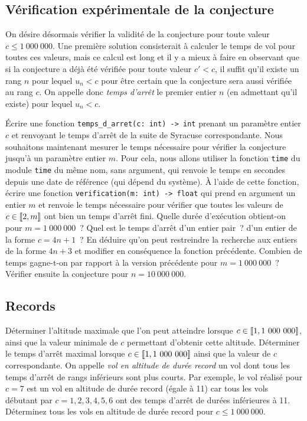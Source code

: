 \documentclass{magnolia}
\begin{document}
\subsection{Vérification expérimentale de la conjecture}

On désire désormais vérifier la validité de la conjecture pour toute valeur $c\leq 1\ 000\ 000$. Une première solution
consisterait à calculer le temps de vol pour toutes ces valeurs, mais ce calcul est long et il y a mieux à faire en
observant que si la conjecture a déjà été vérifiée pour toute valeur $c'<c$, il suffit qu'il existe un rang $n$ pour
lequel $u_n<c$ pour être certain que la conjecture sera aussi vérifiée au rang $c$. On appelle donc
\emph{temps d'arrêt} le premier entier $n$ (en admettant qu'il existe) pour lequel $u_n<c$.

\begin{questions}
\question Écrire une fonction \verb!temps_d_arret(c: int) -> int! prenant un paramètre entier $c$ et renvoyant le temps
  d'arrêt de la suite de Syracuse correspondante.
\enonce Nous souhaitons maintenant mesurer le temps nécessaire pour vérifier la conjecture jusqu'à un paramètre entier
  $m$. Pour cela, nous allons utiliser la fonction \verb!time! du module \verb!time! du même nom, sans argument, qui
  renvoie le temps en secondes depuis une date de référence (qui dépend du système).
\question À l'aide de cette fonction, écrire une fonction \verb!verification(m: int) -> float! qui prend en argument
  un entier $m$ et renvoie le temps nécessaire pour vérifier que toutes les valeurs de $c\in\left\llbracket 2,m\right\rrbracket$ ont bien
  un temps d'arrêt fini. Quelle durée d'exécution obtient-on pour $m=1\ 000\ 000$~?
\question Quel est le temps d'arrêt d'un entier pair~? d'un entier de la forme $c=4n+1$~? En déduire qu'on peut restreindre
  la recherche aux entiers de la forme $4n+3$ et modifier en conséquence la fonction précédente. Combien de temps
  gagne-t-on par rapport à la version précédente pour $m=1\ 000\ 000$~? Vérifier ensuite la conjecture pour
  $n=10\ 000\ 000$.
\end{questions}

\subsection{Records}

\begin{questions}
\question Déterminer l'altitude maximale que l'on peut atteindre lorsque $c\in\left\llbracket 1,1\ 000\ 000\right\rrbracket$, ainsi que la
  valeur minimale de $c$ permettant d'obtenir cette altitude.
\question Déterminer le temps d'arrêt maximal lorsque $c\in\left\llbracket 1,1\ 000\ 000\right\rrbracket$ ainsi que la valeur de $c$
  correspondante.
\enonce On appelle \emph{vol en altitude de durée record} un vol dont tous les temps d'arrêt de rangs inférieurs
  sont plus courts. Par exemple, le vol réalisé pour $c=7$ est un vol en altitude de durée record (égale à 11)
  car tous les vols débutant par $c=1, 2, 3, 4, 5, 6$ ont des temps d'arrêt de durées inférieures à 11.
\question Déterminez tous les vols en altitude de durée record pour $c\leq 1\ 000\ 000$.
\end{questions}
\end{document}
